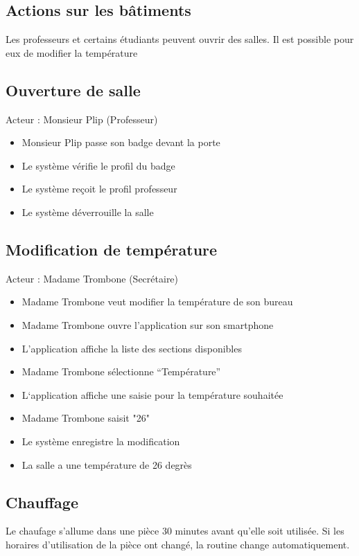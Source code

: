 \newpage

\subsection{Actions sur les bâtiments}

Les professeurs et certains étudiants peuvent ouvrir des salles. Il est possible pour eux de modifier la température

\subsection*{Ouverture de salle}
Acteur : Monsieur Plip (Professeur)
\begin{itemize}
\item Monsieur Plip passe son badge devant la porte 
\item Le système vérifie le profil du badge 
\item Le système reçoit le profil professeur 
\item Le système déverrouille la salle 
\end{itemize}

\subsection*{Modification de température}
Acteur : Madame Trombone (Secrétaire)
\begin{itemize}
\item Madame Trombone veut modifier la température de son bureau 
\item Madame Trombone ouvre l’application sur son smartphone 
\item L’application affiche la liste des sections disponibles 
\item Madame Trombone sélectionne “Température” 
\item L‘application affiche une saisie pour la température souhaitée 
\item Madame Trombone saisit "26" 
\item Le système enregistre la modification 
\item La salle a une température de 26 degrès 
\end{itemize}

\newpage

\subsection{Chauffage}

Le chaufage s'allume dans une pièce 30 minutes avant qu'elle soit utilisée. Si les horaires d'utilisation de la pièce ont changé, la routine change automatiquement.

